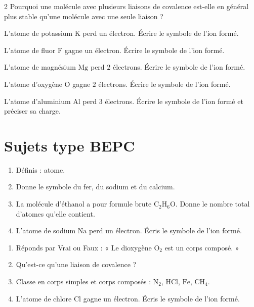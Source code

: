 \begin{multicols}{2}
\exo{} Pourquoi une molécule avec plusieurs liaisons de covalence est-elle en
général plus stable qu'une molécule avec une seule liaison ?

\exo{} L'atome de potassium $\mathrm{K}$ perd un électron. Écrire le symbole de
l'ion formé.

\exo{} L'atome de fluor $\mathrm{F}$ gagne un électron. Écrire le symbole de l'ion
formé.

\exo{} L'atome de magnésium $\mathrm{Mg}$ perd $2$ électrons. Écrire le symbole de
l'ion formé.

\exo{} L'atome d'oxygène $\mathrm{O}$ gagne $2$ électrons. Écrire le symbole de
l'ion formé.

\exo{} L'atome d'aluminium $\mathrm{Al}$ perd $3$ électrons. Écrire le symbole de
l'ion formé et préciser sa charge.

\end{multicols}

\section{Sujets type BEPC}

\begin{enumerate}[label=\arabic*)]
\item Définis : atome.
\item Donne le symbole du fer, du sodium et du calcium.
\item La molécule d'éthanol a pour formule brute $\mathrm{C_2H_6O}$. Donne le nombre total
d'atomes qu'elle contient.
\item L'atome de sodium $\mathrm{Na}$ perd un électron. Écris le symbole de l'ion formé.
\end{enumerate}

\begin{enumerate}[label=\arabic*)]
\item Réponds par Vrai ou Faux : « Le dioxygène $\mathrm{O_2}$ est un corps composé. »
\item Qu'est-ce qu'une liaison de covalence ?
\item Classe en corps simples et corps composés : $\mathrm{N_2}$, $\mathrm{HCl}$,
$\mathrm{Fe}$, $\mathrm{CH_4}$.
\item L'atome de chlore $\mathrm{Cl}$ gagne un électron. Écris le symbole de l'ion formé.
\end{enumerate}

